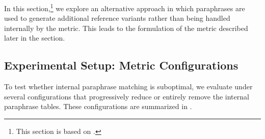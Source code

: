 In this section,\footnote{This section is based on \cite{parmesan}.} we explore an alternative approach in which paraphrases are used to generate additional reference variants rather than being handled internally by the metric. This leads to the formulation of the \parmesan metric described later in the section.


\subsection{Experimental Setup: Metric Configurations}

To test whether internal paraphrase matching is suboptimal, we evaluate \mn under several configurations that progressively reduce or entirely remove the internal paraphrase tables. These configurations are summarized in .

\begin{table}[tb]
\centering
{}
\caption{Different paraphrase tables for the \mn metric and their size (number of paraphrase pairs). The \textbf{Original} configuration corresponds to the original \mn metric, i.e., using the full paraphrase table without filtering.  Conversely, \textbf{No paraphrases} correspond to an empty set, so the \mn metric has to rely solely on exact match. 
}
\label{parmesan:settings}
\end{table}

